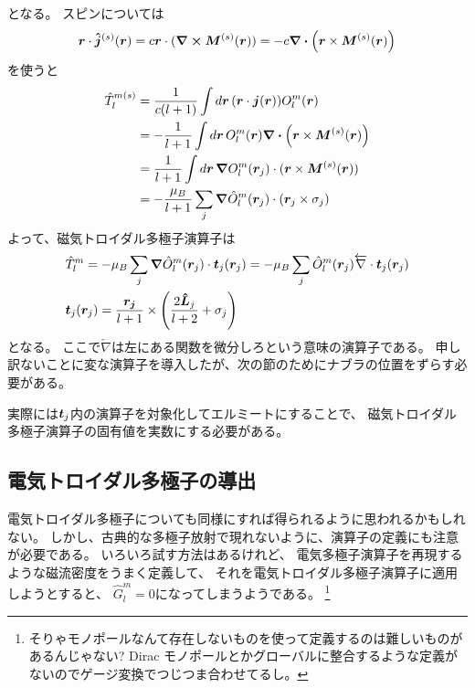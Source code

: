 \documentclass[../../master.tex]{subfiles}
\begin{document}
となる。
スピンについては
\begin{equation}
    \vb*{r}\cdot \vb*{\hat{j}}^{(s)}(\vb*{r}) = c\vb*{r}\cdot(\curl \vb*{M}^{(s)}(\vb*{r})) = -c\div(\vb*{r}\times \vb*{M}^{(s)}(\vb*{r}))
\end{equation}
を使うと
\begin{align}
    \hat{T}_l^{m(s)}
    &= \frac{1}{c(l+1)} \int d\vb*{r}\, (\vb*{r}\cdot\vb*{j}(\vb*{r}))O_l^m(\vb*{r})\\
    &= -\frac{1}{l+1} \int d\vb*{r}\, O_l^m(\vb*{r}) \div(\vb*{r}\times \vb*{M}^{(s)}(\vb*{r}))\\
    &= \frac{1}{l+1} \int d\vb*{r}\, \grad O_l^m(\vb*{r}_j) \cdot (\vb*{r}\times \vb*{M}^{(s)}(\vb*{r})) \\
    &= -\frac{\mu_B}{l+1}\sum_j \grad \hat{O}_l^m(\vb*{r}_j)\cdot (\vb*{r}_j \times \sigma_j)
\end{align}
よって、磁気トロイダル多極子演算子は
\begin{align}
    &\hat{T}_l^m = -\mu_B \sum_j  \grad \hat{O}_l^m(\vb*{r}_j) \cdot \vb*{t}_j(\vb*{r}_j)
    = -\mu_B \sum_j   \hat{O}_l^m(\vb*{r}_j)  \overleftarrow{\nabla} \cdot \vb*{t}_j(\vb*{r}_j)\\
    &\vb*{t}_j(\vb*{r}_j) = \frac{\vb*{r_j}}{l+1} \times \qty(\frac{2\vb*{\hat{L}}_j}{l+2}+\sigma_j)
\end{align}
となる。
ここで\(\overleftarrow{\nabla}\)は左にある関数を微分しろという意味の演算子である。
申し訳ないことに変な演算子を導入したが、次の節のためにナブラの位置をずらす必要がある。

実際には\(\vb*{t}_j\)内の演算子を対象化してエルミートにすることで、
磁気トロイダル多極子演算子の固有値を実数にする必要がある。

\subsection*{電気トロイダル多極子の導出}
電気トロイダル多極子についても同様にすれば得られるように思われるかもしれない。
しかし、古典的な多極子放射で現れないように、演算子の定義にも注意が必要である。
いろいろ試す方法はあるけれど、
電気多極子演算子を再現するような磁流密度をうまく定義して、
それを電気トロイダル多極子演算子に適用しようとすると、
\(\hat{G}_l^m=0\)になってしまうようである。
\footnote{そりゃモノポールなんて存在しないものを使って定義するのは難しいものがあるんじゃない?
Dirac モノポールとかグローバルに整合するような定義がないのでゲージ変換でつじつま合わせてるし。}
\end{document}
